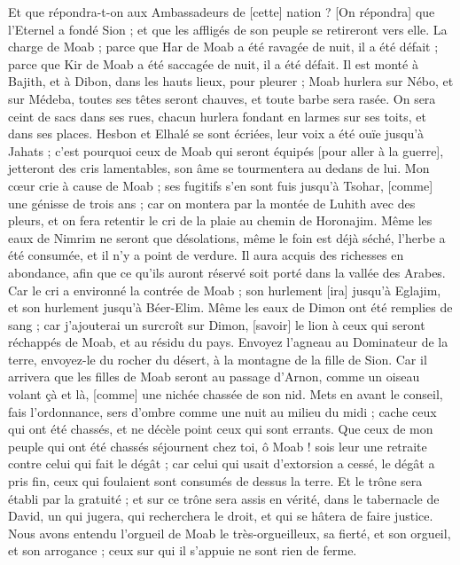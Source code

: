 \begin{multicols}{2}
Et que répondra-t-on aux Ambassadeurs de [cette] nation ? [On répondra] que l'Eternel a fondé Sion ; et que les affligés de son peuple se retireront vers elle.
\VerseOne{}La charge de Moab ; parce que Har de Moab a été ravagée de nuit, il a été défait ; parce que Kir de Moab a été saccagée de nuit, il a été défait.
Il est monté à Bajith, et à Dibon, dans les hauts lieux, pour pleurer ; Moab hurlera sur Nébo, et sur Médeba, toutes ses têtes seront chauves, et toute barbe sera rasée.
On sera ceint de sacs dans ses rues, chacun hurlera fondant en larmes sur ses toits, et dans ses places.
Hesbon et Elhalé se sont écriées, leur voix a été ouïe jusqu'à Jahats ; c'est pourquoi ceux de Moab qui seront équipés [pour aller à la guerre], jetteront des cris lamentables, son âme se tourmentera au dedans de lui.
Mon cœur crie à cause de Moab ; ses fugitifs s'en sont fuis jusqu'à Tsohar, [comme] une génisse de trois ans ; car on montera par la montée de Luhith avec des pleurs, et on fera retentir le cri de la plaie au chemin de Horonajim.
Même les eaux de Nimrim ne seront que désolations, même le foin est déjà séché, l'herbe a été consumée, et il n'y a point de verdure.
Il aura acquis des richesses en abondance, afin que ce qu'ils auront réservé soit porté dans la vallée des Arabes.
Car le cri a environné la contrée de Moab ; son hurlement [ira] jusqu'à Eglajim, et son hurlement jusqu'à Béer-Elim.
Même les eaux de Dimon ont été remplies de sang ; car j'ajouterai un surcroît sur Dimon, [savoir] le lion à ceux qui seront réchappés de Moab, et au résidu du pays.
\VerseOne{}Envoyez l'agneau au Dominateur de la terre, envoyez-le du rocher du désert, à la montagne de la fille de Sion.
Car il arrivera que les filles de Moab seront au passage d'Arnon, comme un oiseau volant çà et là, [comme] une nichée chassée de son nid.
Mets en avant le conseil, fais l'ordonnance, sers d'ombre comme une nuit au milieu du midi ; cache ceux qui ont été chassés, et ne décèle point ceux qui sont errants.
Que ceux de mon peuple qui ont été chassés séjournent chez toi, ô Moab ! sois leur une retraite contre celui qui fait le dégât ; car celui qui usait d'extorsion a cessé, le dégât a pris fin, ceux qui foulaient sont consumés de dessus la terre.
Et le trône sera établi par la gratuité ; et sur ce trône sera assis en vérité, dans le tabernacle de David, un qui jugera, qui recherchera le droit, et qui se hâtera de faire justice.
Nous avons entendu l'orgueil de Moab le très-orgueilleux, sa fierté, et son orgueil, et son arrogance ; ceux sur qui il s'appuie ne sont rien de ferme.

\end{multicols}
